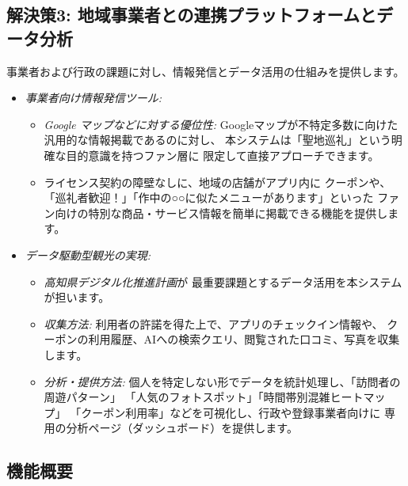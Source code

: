 \documentclass{docs}
\begin{document}
\subsection{解決策3: 地域事業者との連携プラットフォームとデータ分析}
事業者および行政の課題に対し、情報発信とデータ活用の仕組みを提供します。
\begin{itemize}
	\item \emph{事業者向け情報発信ツール:}
	\begin{itemize}
		\item \emph{Google マップなどに対する優位性:}
		Googleマップが不特定多数に向けた汎用的な情報掲載であるのに対し、
		本システムは「聖地巡礼」という明確な目的意識を持つファン層に
		限定して直接アプローチできます。
		\item ライセンス契約\cite{nri2024}の障壁なしに、地域の店舗がアプリ内に
		クーポンや、「巡礼者歓迎！」「作中の○○に似たメニューがあります」といった
		ファン向けの特別な商品・サービス情報を簡単に掲載できる機能を提供します。
	\end{itemize}
	\item \emph{データ駆動型観光の実現:}
	\begin{itemize}
		\item \emph{高知県デジタル化推進計画\cite{kochi_dx_plan}}が
		最重要課題とするデータ活用を本システムが担います。
		\item \emph{収集方法:}
		利用者の許諾を得た上で、アプリのチェックイン情報や、
		クーポンの利用履歴、AIへの検索クエリ、閲覧された口コミ、写真を収集します。
		\item \emph{分析・提供方法:}
		個人を特定しない形でデータを統計処理し、「訪問者の周遊パターン」
		「人気のフォトスポット」「時間帯別混雑ヒートマップ」
		「クーポン利用率」などを可視化し、行政や登録事業者向けに
		専用の分析ページ（ダッシュボード）を提供します。
	\end{itemize}
\end{itemize}

\subsection{機能概要}
\end{document}
